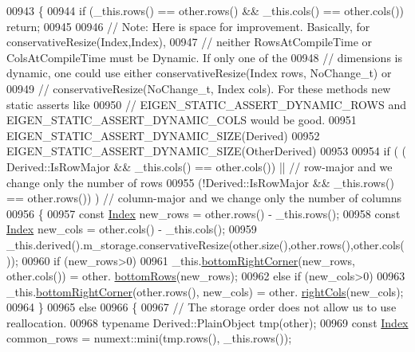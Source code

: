 \begin{DoxyCode}
00943   \{
00944     \textcolor{keywordflow}{if} (\_this.rows() == other.rows() && \_this.cols() == other.cols()) \textcolor{keywordflow}{return};
00945 
00946     \textcolor{comment}{// Note: Here is space for improvement. Basically, for conservativeResize(Index,Index),}
00947     \textcolor{comment}{// neither RowsAtCompileTime or ColsAtCompileTime must be Dynamic. If only one of the}
00948     \textcolor{comment}{// dimensions is dynamic, one could use either conservativeResize(Index rows, NoChange\_t) or}
00949     \textcolor{comment}{// conservativeResize(NoChange\_t, Index cols). For these methods new static asserts like}
00950     \textcolor{comment}{// EIGEN\_STATIC\_ASSERT\_DYNAMIC\_ROWS and EIGEN\_STATIC\_ASSERT\_DYNAMIC\_COLS would be good.}
00951     EIGEN\_STATIC\_ASSERT\_DYNAMIC\_SIZE(Derived)
00952     EIGEN\_STATIC\_ASSERT\_DYNAMIC\_SIZE(OtherDerived)
00953 
00954     \textcolor{keywordflow}{if} ( ( Derived::IsRowMajor && \_this.cols() == other.cols()) || \textcolor{comment}{// row-major and we change only the
       number of rows}
00955          (!Derived::IsRowMajor && \_this.rows() == other.rows()) )  \textcolor{comment}{// column-major and we change only the
       number of columns}
00956     \{
00957       \textcolor{keyword}{const} \hyperlink{namespace_eigen_a62e77e0933482dafde8fe197d9a2cfde}{Index} new\_rows = other.rows() - \_this.rows();
00958       \textcolor{keyword}{const} \hyperlink{namespace_eigen_a62e77e0933482dafde8fe197d9a2cfde}{Index} new\_cols = other.cols() - \_this.cols();
00959       \_this.derived().m\_storage.conservativeResize(other.size(),other.rows(),other.cols());
00960       \textcolor{keywordflow}{if} (new\_rows>0)
00961         \_this.\hyperlink{group___core___module_a6cdf27f6b825097f86fc6bcdbeed9e65}{bottomRightCorner}(new\_rows, other.cols()) = other.
      \hyperlink{group___core___module_acff625e5f44ffe92bf79d20223114c2d}{bottomRows}(new\_rows);
00962       \textcolor{keywordflow}{else} \textcolor{keywordflow}{if} (new\_cols>0)
00963         \_this.\hyperlink{group___core___module_a6cdf27f6b825097f86fc6bcdbeed9e65}{bottomRightCorner}(other.rows(), new\_cols) = other.
      \hyperlink{group___core___module_a5b0fa44c191d40a2f82260f7e5cdeaa9}{rightCols}(new\_cols);
00964     \}
00965     \textcolor{keywordflow}{else}
00966     \{
00967       \textcolor{comment}{// The storage order does not allow us to use reallocation.}
00968       \textcolor{keyword}{typename} Derived::PlainObject tmp(other);
00969       \textcolor{keyword}{const} \hyperlink{namespace_eigen_a62e77e0933482dafde8fe197d9a2cfde}{Index} common\_rows = numext::mini(tmp.rows(), \_this.rows());

\end{DoxyCode}
